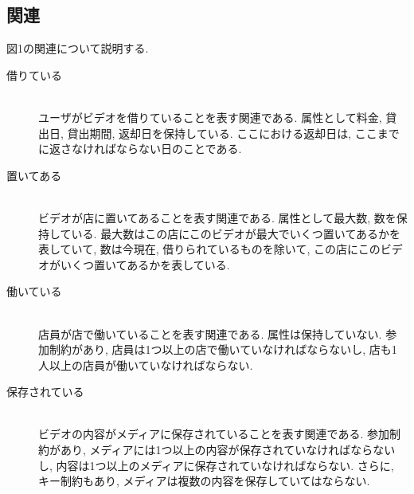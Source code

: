 \documentclass{jarticle}
\begin{document}
\subsection{関連}
図1の関連について説明する.
\begin{description}
\item[借りている] \leavevmode \\
ユーザがビデオを借りていることを表す関連である. 属性として料金, 貸出日, 貸出期間, 返却日を保持している. ここにおける返却日は, ここまでに返さなければならない日のことである.
\item[置いてある] \leavevmode \\
ビデオが店に置いてあることを表す関連である. 属性として最大数, 数を保持している. 最大数はこの店にこのビデオが最大でいくつ置いてあるかを表していて, 数は今現在, 借りられているものを除いて, この店にこのビデオがいくつ置いてあるかを表している.  
\item[働いている] \leavevmode \\
店員が店で働いていることを表す関連である. 属性は保持していない. 参加制約があり, 店員は1つ以上の店で働いていなければならないし, 店も1人以上の店員が働いていなければならない.
\item[保存されている] \leavevmode \\
ビデオの内容がメディアに保存されていることを表す関連である. 参加制約があり, メディアには1つ以上の内容が保存されていなければならないし, 内容は1つ以上のメディアに保存されていなければならない. さらに, キー制約もあり, メディアは複数の内容を保存していてはならない.
\end{description}
\end{document}
